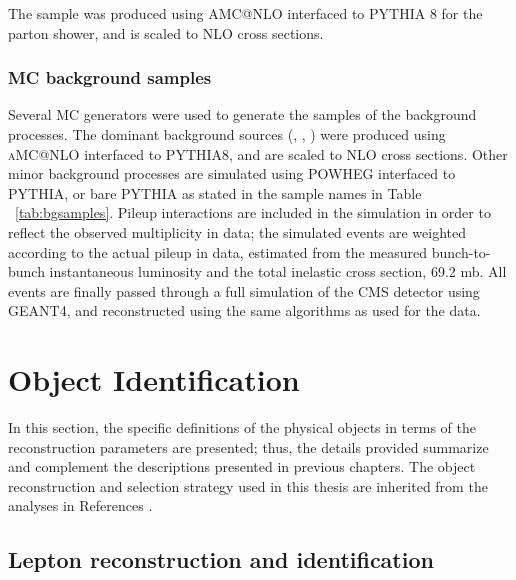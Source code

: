 The \ttH sample was produced using \textsc{AMC@NLO} interfaced to \textsc{PYTHIA} 8 for the parton shower, and is scaled to NLO cross sections.%


\subsubsection*{MC background samples}

Several MC generators were used to generate the samples of the background processes. The dominant background sources (\ttbar, \ttW, \ttZ) were produced using \textsc{aMC@NLO} interfaced to PYTHIA8, and are scaled to NLO cross sections. Other minor background processes are simulated using POWHEG interfaced to PYTHIA, or bare PYTHIA as stated in the sample names in Table ~\ref{tab:bgsamples}. Pileup interactions are included in the simulation in order to reflect the observed multiplicity in data; the simulated events are weighted according to the actual pileup in data, estimated from the measured bunch-to-bunch instantaneous luminosity and the total inelastic cross section, 69.2 mb. All events are finally passed through a full simulation of the CMS detector using GEANT4, and reconstructed using the same algorithms as used for the data.
\section{Object Identification}\label{sec:ob_id}


In this section, the specific definitions of the physical objects in terms of the reconstruction parameters are presented; thus, the details provided summarize and complement the descriptions presented in previous chapters. The object reconstruction and selection strategy used in this thesis are inherited from the analyses in References \cite{CMS_AN_2016-211,CMS_AN_2017-029}.

\subsection{Lepton reconstruction and identification}

